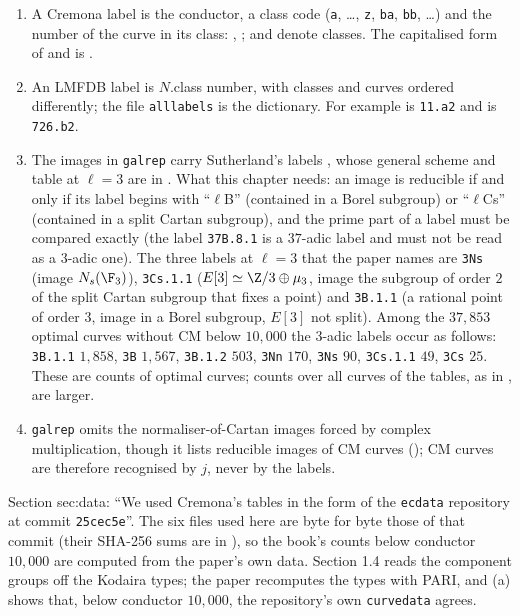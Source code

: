 \begin{sloppypar}
\begin{convention}[labels]\label{conv:computation:labels}
\begin{enumerate}[label=(\roman*)]
\item A Cremona label is the conductor, a class code (\texttt{a}, \dots, \texttt{z}, \texttt{ba}, \texttt{bb}, \dots) and the number of the curve in its
class: , ;  and  denote classes. The capitalised form  of \cite{Cremona97} and \cite{ARS12} is
.
\item An LMFDB label \cite{LMFDB} is $N$.class number, with classes and curves ordered differently; the file \texttt{alllabels} is the
dictionary. For example  is \texttt{11.a2} and  is \texttt{726.b2}.
\item The images in \texttt{galrep} carry Sutherland's labels \cite{Sutherland16}, whose general scheme and table at $\ell=3$ are in
. What this chapter needs: an image is reducible if and only if its label begins with ``$\ell$B'' (contained in a Borel
subgroup) or ``$\ell$Cs'' (contained in a split Cartan subgroup), and the prime part of a label must be compared exactly (the label
\texttt{37B.8.1} is a $37$-adic label and must not be read as a $3$-adic one). The three labels at $\ell=3$ that the paper names are \texttt{3Ns}
(image $N_s(\F_3)$), \texttt{3Cs.1.1} ($E[3]\simeq\Z/3\oplus\mu_3$, image the subgroup of order $2$ of the split Cartan subgroup that fixes a point) and
\texttt{3B.1.1} (a rational point of order $3$, image in a Borel subgroup, $E[3]$ not split). Among the $37{,}853$ optimal curves without CM below
$10{,}000$ the $3$-adic labels occur as follows: \texttt{3B.1.1} $1{,}858$, \texttt{3B} $1{,}567$, \texttt{3B.1.2} $503$, \texttt{3Nn} $170$, \texttt{3Ns} $90$,
\texttt{3Cs.1.1} $49$, \texttt{3Cs} $25$. These are counts of optimal curves; counts over all curves of the tables, as in , are larger.
\item \texttt{galrep} omits the normaliser-of-Cartan images forced by complex multiplication, though it lists reducible images of CM curves
(); CM curves are therefore recognised by $j$, never by the labels.
\end{enumerate}
\end{convention}

\begin{paperlink}\label{pl:computation:ecdata}
Section sec:data: ``We used Cremona's tables \cite{Cremona97} in the form of the \texttt{ecdata} repository at commit \texttt{25cec5e}''. The six
files used here are byte for byte those of that commit (their SHA-256 sums are in ), so the book's counts
below conductor $10{,}000$ are computed from the paper's own data. Section 1.4 reads the component groups off the Kodaira types; the paper
recomputes the types with PARI, and (a) shows that, below conductor $10{,}000$, the repository's own
\texttt{curvedata} agrees.
\end{paperlink}


\end{sloppypar}
